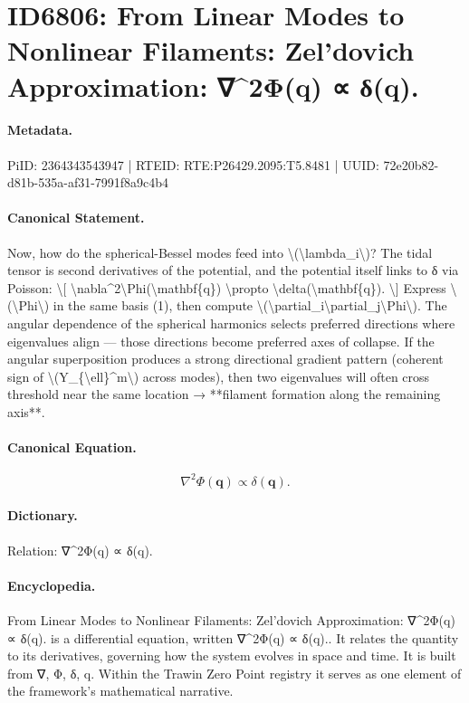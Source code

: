 \section*{ID6806: From Linear Modes to Nonlinear Filaments: Zel’dovich Approximation: ∇\textasciicircum{}2Φ(q) ∝ δ(q).}
\paragraph{Metadata.}
PiID: 2364343543947 | RTEID: RTE:P26429.2095:T5.8481 | UUID: 72e20b82-d81b-535a-af31-7991f8a9c4b4

\paragraph{Canonical Statement.}
Now, how do the spherical-Bessel modes feed into \textbackslash{}(\textbackslash{}lambda\_i\textbackslash{})? The tidal tensor is second derivatives of the potential, and the potential itself links to δ via Poisson: \textbackslash{}[ \textbackslash{}nabla\textasciicircum{}2\textbackslash{}Phi(\textbackslash{}mathbf\{q\}) \textbackslash{}propto \textbackslash{}delta(\textbackslash{}mathbf\{q\}). \textbackslash{}] Express \textbackslash{}(\textbackslash{}Phi\textbackslash{}) in the same basis (1), then compute \textbackslash{}(\textbackslash{}partial\_i\textbackslash{}partial\_j\textbackslash{}Phi\textbackslash{}). The angular dependence of the spherical harmonics selects preferred directions where eigenvalues align — those directions become preferred axes of collapse. If the angular superposition produces a strong directional gradient pattern (coherent sign of \textbackslash{}(Y\_\{\textbackslash{}ell\}\textasciicircum{}m\textbackslash{}) across modes), then two eigenvalues will often cross threshold near the same location → **filament formation along the remaining axis**.

\paragraph{Canonical Equation.}
\[
\nabla^2\Phi(\mathbf{q}) \propto \delta(\mathbf{q}).
\]

\paragraph{Dictionary.}
Relation: ∇\textasciicircum{}2Φ(q) ∝ δ(q).

\paragraph{Encyclopedia.}
From Linear Modes to Nonlinear Filaments: Zel’dovich Approximation: ∇\textasciicircum{}2Φ(q) ∝ δ(q). is a differential equation, written ∇\textasciicircum{}2Φ(q) ∝ δ(q).. It relates the quantity to its derivatives, governing how the system evolves in space and time. It is built from ∇, Φ, δ, q. Within the Trawin Zero Point registry it serves as one element of the framework's mathematical narrative.
